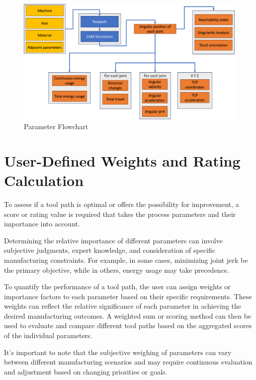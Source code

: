 \begin{figure}[H]
	\centerline{\includegraphics[scale=.5]{figures/Flow.png}}
	\caption{Parameter Flowchart}
	\label{ParamsFlow}
\end{figure}

\newpage

\section{User-Defined Weights and Rating Calculation}\label{weights}
To assess if a tool path is optimal or offers the possibility for improvement, a score or rating value is required that takes the process parameters and their importance into account. 

Determining the relative importance of different parameters can involve subjective judgments, expert knowledge, and consideration of specific manufacturing constraints. For example, in some cases, minimizing joint jerk be the primary objective, while in others, energy usage may take precedence.

To quantify the performance of a tool path, the user can assign weights or importance factors to each parameter based on their specific requirements. These weights can reflect the relative significance of each parameter in achieving the desired manufacturing outcomes. A weighted sum or scoring method can then be used to evaluate and compare different tool paths based on the aggregated scores of the individual parameters. %

It's important to note that the subjective weighing of parameters can vary between different manufacturing scenarios and may require continuous evaluation and adjustment based on changing priorities or goals.

